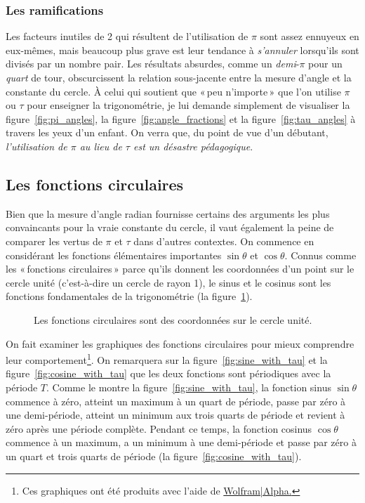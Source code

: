     \subsubsection{Les ramifications} %
    \label{sec:the_ramifications}


Les facteurs inutiles de 2 qui résultent de l'utilisation de $\pi$ sont assez
ennuyeux en eux-mêmes, mais beaucoup plus grave est leur tendance à
\emph{s'annuler} lorsqu'ils sont divisés par un nombre pair. Les résultats
absurdes, comme un \emph{demi}-$\pi$ pour un \emph{quart} de tour, obscurcissent
la relation sous-jacente entre la mesure d'angle et la constante du cercle. À
celui qui soutient que «\,peu n'importe\,» que l'on utilise $\pi$ ou $\tau$ pour
enseigner la trigonométrie, je lui demande simplement de visualiser la
figure~\ref{fig:pi_angles}, la figure~\ref{fig:angle_fractions} et la
figure~\ref{fig:tau_angles} à travers les yeux d'un enfant. On verra que, du
point de vue d'un débutant, \emph{l'utilisation de $\pi$ au lieu de $\tau$ est
un désastre pédagogique}.

  \subsection{Les fonctions circulaires} %
  \label{sec:the_circle_functions}

Bien que la mesure d'angle radian fournisse certains des arguments les plus
convaincants pour la vraie constante du cercle, il vaut également la peine de
comparer les vertus de $\pi$ et $\tau$ dans d'autres contextes. On commence en
considérant les fonctions élémentaires importantes $\sin\theta$ et $\cos\theta$.
Connus comme les «\,fonctions circulaires\,» parce qu'ils donnent les
coordonnées d'un point sur le cercle unité (c'est-à-dire un cercle de rayon 1),
le sinus et le cosinus sont les fonctions fondamentales de la trigonométrie (la
figure~\ref{fig:circle_functions}).

\begin{figure}
\begin{center}
\end{center}
\caption{Les fonctions circulaires sont des coordonnées sur le cercle
unité.\label{fig:circle_functions}}
\end{figure}

On fait examiner les graphiques des fonctions circulaires pour mieux comprendre
leur comportement\footnote{Ces graphiques ont été produits avec l'aide de
\href{https://www.wolframalpha.com/}{Wolfram|Alpha.}}. On remarquera sur la
figure~\ref{fig:sine_with_tau} et la figure~\ref{fig:cosine_with_tau} que les
deux fonctions sont périodiques avec la période $T$. Comme le montre la
figure~\ref{fig:sine_with_tau}, la fonction sinus $\sin\theta$ commence à zéro,
atteint un maximum à un quart de période, passe par zéro à une demi-période,
atteint un minimum aux trois quarts de période et revient à zéro après une
période complète. Pendant ce temps, la fonction cosinus $\cos\theta$ commence à
un maximum, a un minimum à une demi-période et passe par zéro à un quart et
trois quarts de période (la figure~\ref{fig:cosine_with_tau}).

